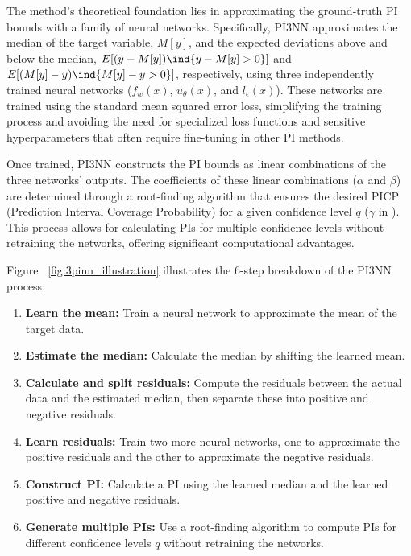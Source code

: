 The method's theoretical foundation lies in approximating the ground-truth PI bounds with a family of neural networks. Specifically, PI3NN approximates the median of the target variable, $M[y]$, and the expected deviations above and below the median, $E[(y - M[y])\ind{y-M[y]>0}]$ and $E[(M[y] - y)\ind{M[y]-y>0}]$, respectively, using three independently trained neural networks ($f_w(x)$, $u_\theta(x)$, and $l_\epsilon(x)$). These networks are trained using the standard mean squared error loss, simplifying the training process and avoiding the need for specialized loss functions and sensitive hyperparameters that often require fine-tuning in other PI methods.

Once trained, PI3NN constructs the PI bounds as linear combinations of the three networks' outputs. The coefficients of these linear combinations ($\alpha$ and $\beta$) are determined through a root-finding algorithm that ensures the desired PICP (Prediction Interval Coverage Probability) for a given confidence level $q$ ($\gamma$ in \cite{pi3nn}). This process allows for calculating PIs for multiple confidence levels without retraining the networks, offering significant computational advantages.


Figure ~\vref{fig:3pinn_illustration} illustrates the 6-step breakdown of the PI3NN process:
\begin{enumerate}
    \item \textbf{Learn the mean:} Train a neural network to approximate the mean of the target data.
    \item \textbf{Estimate the median:} Calculate the median by shifting the learned mean.
    \item \textbf{Calculate and split residuals:} Compute the residuals between the actual data and the estimated median, then separate these into positive and negative residuals.
    \item \textbf{Learn residuals:} Train two more neural networks, one to approximate the positive residuals and the other to approximate the negative residuals.
    \item \textbf{Construct PI:} Calculate a PI using the learned median and the learned positive and negative residuals.
    \item \textbf{Generate multiple PIs:} Use a root-finding algorithm to compute PIs for different confidence levels $q$ without retraining the networks.
\end{enumerate}


